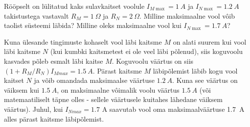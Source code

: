 
Rööpselt on lülitatud kaks sulavkaitset voolule $I_{M \max }=\SI{1}{A}$ ja $I_{N \max }=\SI{1,2}{A}$ takistustega vastavalt $R_{M}=\SI{1}{\Omega}$ ja $R_{N}=\SI{2}{\Omega}$. Milline maksimaalne vool vôib taolist süsteemi läbida? Milline oleks maksimaalne vool kui $I_{N \max }=\SI{1,7}{A}$?

\hint

\solu
Kuna ülesande tingimuste kohaselt vool läbi kaitsme $M$ on alati suurem kui vool läbi kaitsme $N$ (kui kumbki kaitsmetest ei ole veel läbi põlenud), siis koguvoolu kasvades põleb esmalt läbi kaitse $M$. Koguvoolu väärtus on siis $\left(1+R_{M} / R_{N}\right) I_{M max }=\SI{1,5}{A}$. Pärast kaitsme $M$ läbipõlemist läbib kogu vool kaitset $N$ ja võib omandada maksimaalse väärtuse $\SI{1,2}{A}$. Kuna see väärtus on väiksem kui $\SI{1,5}{A}$, on maksimaalne vôimalik voolu väärtus $\SI{1,5}{A}$ (või matemaatiliselt täpne olles - sellele väärtusele kuitahes lähedane väiksem väärtus). Juhul, kui $I_{N max }=\num{1,7}$ A saavutab vool oma maksimaalväärtuse \SI{1,7}{A} alles pärast kaitsme läbipõlemist.

\probend
